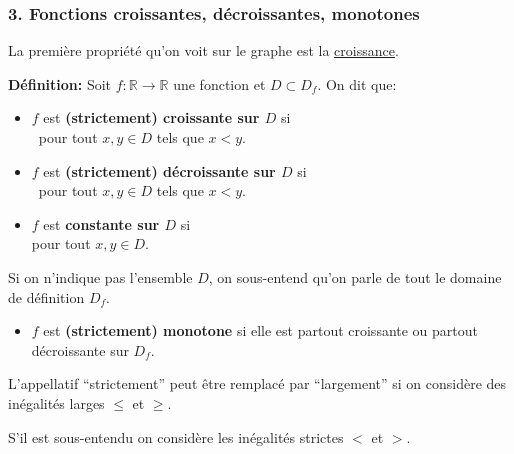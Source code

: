 \documentclass[10pt]{beamer}
\newcommand{\bitem}{\item[$\bullet$]}
\newcommand{\R}{\mathbb R}
\begin{document}
\begin{frame}[plain]
\frametitle{\bf 3. Fonctions croissantes, d\'ecroissantes, monotones}
\medskip 

{\small 
La premi\`ere propri\'et\'e qu'on voit sur le graphe est la 
\underline{croissance}.}
\vspace*{2mm}

{\bf D\'efinition:} 
Soit $f:\R\rightarrow\R$ une fonction et $D\subset D_f$. On dit que: 
\vspace*{1mm}

\begin{itemize}
\bitem
\parbox[t]{7.5cm}{
$f$ est {\bf (strictement) croissante sur $D$} si\\ 
\ pour tout $x,y\in D$ tels que $x<y$. 
}
\quad
\raisebox{-.7\height}{\croissant}  
\vspace*{1mm}

\bitem
\parbox[t]{7.5cm}{
$f$ est {\bf (strictement) d\'ecroissante sur $D$} si\\ 
\ pour tout $x,y\in D$ tels que $x<y$.
}
\quad
\raisebox{-.7\height}{\decroissant}  
\vspace*{1mm}

\bitem
\parbox[t]{7.5cm}{
$f$ est {\bf constante sur $D$} si\ \\ 
pour tout $x,y\in D$.
}
\quad
\raisebox{-.7\height}{\constant}  
\end{itemize} 
\vspace*{1mm}

\pause
{\small
Si on n'indique pas l'ensemble $D$, on sous-entend qu'on parle de tout le 
domaine de d\'efinition $D_f$.
} 
\vspace*{2mm}

\pause
\begin{itemize}
\bitem
$f$ est {\bf (strictement) monotone} si elle est partout croissante 
ou partout d\'ecroissante sur $D_f$.
\end{itemize} 
\vspace*{2mm}

\pause
{\small
L'appellatif ``strictement'' peut \^etre remplac\'e par ``largement'' 
si on consid\`ere des in\'egalit\'es larges $\leq$ et $\geq$. 

S'il est sous-entendu on consid\`ere les in\'egalit\'es strictes $<$ et $>$.
}

\end{frame}
\end{document}
